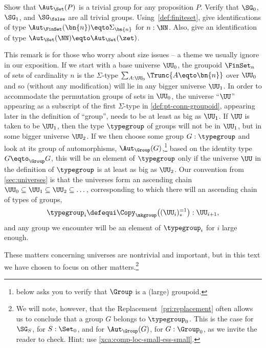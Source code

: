 \begin{xca}
  \label{xca:group-example-details}
  Show that $\Aut_{\Set}(P)$ is a trivial group for any proposition $P$.
  Verify that $\SG_0$, $\SG_1$, and $\SG_\false$ are all trivial groups.
  Using~\cref{def:finiteset}, give identifications of type 
  $\Aut_\FinSet(\bn{n})\eqto\Sigma_{\bn{n}}$ for $n:\NN$.
  Also, give an identification of type $\Aut_\Set(\NN)\eqto\Aut_\Set(\zet)$. 
\end{xca}

\begin{remark}
  \label{rem:groupsarebig}
  This remark is for those who worry about size issues -- a theme we usually ignore in our exposition.  If we
  start with a base universe $\UU_0$, the groupoid $\FinSet_n$ of sets of cardinality $n$ is the $\Sigma$-type
  $\sum_{A:\UU_0}\Trunc{A\eqto\bn{n}}$ over $\UU_0$ and so (without any modification) will lie in any bigger
  universe $\UU_1$.  In order to accommodate the permutation groups of sets in $\UU_0$, the universe ``$\UU$'' appearing as
  a subscript of the first $\Sigma$-type in \cref{def:pt-conn-groupoid}, appearing later in the definition of
  ``group'', needs to be at least as big as $\UU_1$.  If $\UU$ is taken to be $\UU_1$, then the type
  $\typegroup$ of groups will not be in $\UU_1$, but in some bigger universe $\UU_2$.
  If we then choose some group $G:\typegroup$
  and look at its group of automorphisms, $\Aut_\Group(G)$,\footnote{%
     below asks you to verify that $\Group$
    is a (large) groupoid.}
  based on the identity type $G \eqto_\Group G$, this will be an element of $\typegroup$ only if the universe $\UU$ in the definition of
  $\typegroup$ is at least as big as $\UU_2$.  Our convention from \cref{sec:universes} is
  that the universes form an ascending chain $\UU_0\subseteq\UU_1\subseteq\UU_2\subseteq\dots$, corresponding
  to which there will an ascending chain of types of groups,
  \[
    \typegroup_i \defequi \Copy_{\mkgroup}\bigl( (\UU_i)_*^{=1} \bigr) : \UU_{i+1},
  \]
  and any group we encounter will be an element of $\typegroup_i$ for $i$
  large enough.

  These matters concerning universes are nontrivial and important,
  but in this text we have chosen to focus on other matters.\footnote{%
    We will note, however, that the Replacement~\cref{pri:replacement}
    often allows us to conclude that a group $G$ belongs to $\typegroup_0$.
    This is the case for $\SG_S$, for $S:\Set_0$, and for $\Aut_\Group(G)$,
    for $G:\Group_0$, as we invite the reader to check.
    Hint: use \cref{xca:comp-loc-small-ess-small}.}
\end{remark}

